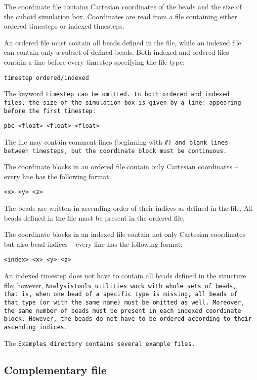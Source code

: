 The coordinate file contains Cartesian coordinates of the beads and the
size of the cuboid simulation box.
Coordinates are read from a \vcf file
containing either ordered timesteps or
indexed timesteps.

An ordered \vcf file must contain all beads defined in the \vsf file, while
an indexed \vcf file can contain only a subset of defined beads. Both
indexed and ordered \vcf files contain a line before every timestep
specifying the file type:
\begin{verbatim}timestep ordered/indexed\end{verbatim}
The keyword \tt{timestep} can be omitted.  In
both ordered and indexed \vcf files, the size of the simulation box is
given by a line: appearing before the first timestep:
\begin{verbatim}pbc <float> <float> <float>\end{verbatim}

The \vcf file may contain comment lines (beginning with
\tt{\#}) and blank lines between timesteps, but the coordinate block
must be continuous.

The coordinate blocks in an ordered \vcf file contain only Cartesian
coordinates -- every line has the following format:
\begin{verbatim}<x> <y> <z>\end{verbatim}
The beads are written in ascending order of their indices as defined in the
\vsf file. All beads defined in the \vsf file must be present in the
ordered \vcf file.

The coordinate blocks in an indexed \vcf file contain not only Cartesian
coordinates but also bead indices -- every line has the following format:
\begin{verbatim}<index> <x> <y> <z>\end{verbatim}
An indexed timestep does not have to contain all beads
defined in the \vsf structure file; however, \tt{AnalysisTools} utilities
work with whole sets of beads, that is, when one bead of a specific type is
missing, all beads of that type (or with the same name) must be omitted as
well. Moreover, the same number of beads must be present in each indexed
coordinate block. However, the beads do not have to be ordered according to
their ascending indices.

The \tt{Examples} directory contains several example \vtf files. %

\subsection{Complementary \field file} %


